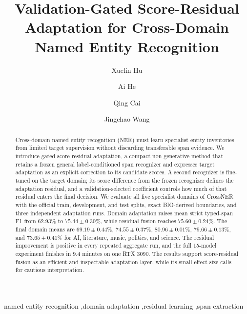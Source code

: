 \documentclass[a4paper,fleqn,numbers,doubleblind]{cas-dc}
\begin{document}
\let\WriteBookmarks\relax
{}
\title[mode=title]{Validation-Gated Score-Residual Adaptation for Cross-Domain Named Entity Recognition}
\author{Xuelin Hu}
\author{Ai He}
\author{Qing Cai}
\author{Jingchao Wang}

\begin{abstract}
Cross-domain named entity recognition (NER) must learn specialist entity inventories from limited target supervision without discarding transferable span evidence. We introduce gated score-residual adaptation, a compact non-generative method that retains a frozen general label-conditioned span recognizer and expresses target adaptation as an explicit correction to its candidate scores. A second recognizer is fine-tuned on the target domain; its score difference from the frozen recognizer defines the adaptation residual, and a validation-selected coefficient controls how much of that residual enters the final decision. We evaluate all five specialist domains of CrossNER with the official train, development, and test splits, exact BIO-derived boundaries, and three independent adaptation runs. Domain adaptation raises mean strict typed-span F1 from 62.93\% to $75.44\pm0.30$\%, while residual fusion reaches $75.60\pm0.24$\%. The final domain means are $69.19\pm0.44$\%, $74.55\pm0.37$\%, $80.96\pm0.01$\%, $79.66\pm0.13$\%, and $73.65\pm0.41$\% for AI, literature, music, politics, and science. The residual improvement is positive in every repeated aggregate run, and the full 15-model experiment finishes in 9.4 minutes on one RTX 3090. The results support score-residual fusion as an efficient and inspectable adaptation layer, while its small effect size calls for cautious interpretation.
\end{abstract}

\begin{keywords}
named entity recognition \sep domain adaptation \sep residual learning \sep span extraction
\end{keywords}

\maketitle
\end{document}

